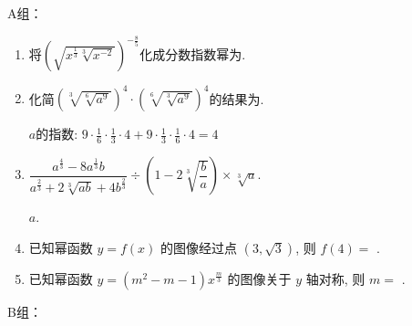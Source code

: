 A组：
\begin{enumerate}
\item 将$\left(\sqrt{x^{\frac{1}{3}}\sqrt[3]{x^{-2}}}\right)^{-\frac{8}{5}}$化成分数指数幂为. 

\item 化简$\left(\sqrt[3]{\sqrt[6]{a^9}}\right)^4\cdot\left(\sqrt[6]{\sqrt[3]{a^9}}\right)^4$的结果为. 
\begin{jieda}
$a$的指数: $9\cdot\frac{1}{6}\cdot\frac{1}{3}\cdot 4+9\cdot\frac{1}{3}\cdot\frac{1}{6}\cdot4=4$
\end{jieda}

\item $\dfrac{a^{\frac{4}{3}}-8a^{\frac{1}{3}}b}{a^{\frac{2}{3}}+2\sqrt[3]{ab}+4b^{\frac{2}{3}}}\div\left(1-2\sqrt[3]{\dfrac{b}{a}}\right)\times\sqrt[3]{a}$. 
\begin{jieda}
$a$. 
\end{jieda}

\item 已知幂函数 $y=f(x)$ 的图像经过点 $(3, \sqrt{3})$, 则 $f(4)=$ .
\item 已知幂函数 $y=\left(m^2-m-1\right) x^{\frac{m}{3}}$ 的图像关于 $y$ 轴对称, 则 $m=$ .

\end{enumerate}

B组：

